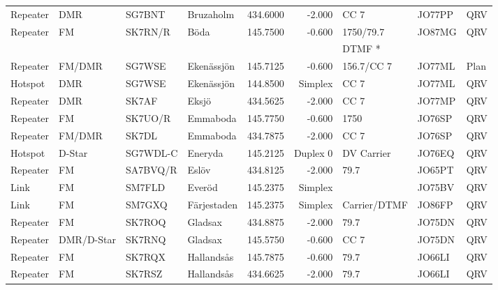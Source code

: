 \begin{longtable}{llllrrlll}
Repeater & DMR             & SG7BNT   & Bruzaholm    & 434.6000     & -2.000     & CC 7         & JO77PP      & QRV      \\
Repeater & FM              & SK7RN/R  & Böda         & 145.7500     & -0.600     & 1750/79.7    & JO87MG      & QRV      \\
         &                 &          &              &              &            & DTMF *       &             &          \\
Repeater & FM/DMR          & SG7WSE   & Ekenässjön   & 145.7125     & -0.600     & 156.7/CC 7   & JO77ML      & Plan     \\
Hotspot  & DMR             & SG7WSE   & Ekenässjön   & 144.8500     & Simplex    & CC 7         & JO77ML      & QRV      \\
Repeater & DMR             & SK7AF    & Eksjö        & 434.5625     & -2.000     & CC 7         & JO77MP      & QRV      \\
Repeater & FM              & SK7UO/R  & Emmaboda     & 145.7750     & -0.600     & 1750         & JO76SP      & QRV      \\
Repeater & FM/DMR          & SK7DL    & Emmaboda     & 434.7875     & -2.000     & CC 7         & JO76SP      & QRV      \\
Hotspot  & D-Star          & SG7WDL-C & Eneryda      & 145.2125     & Duplex 0   & DV Carrier   & JO76EQ      & QRV      \\
Repeater & FM              & SA7BVQ/R & Eslöv        & 434.8125     & -2.000     & 79.7         & JO65PT      & QRV      \\
Link     & FM              & SM7FLD   & Everöd       & 145.2375     & Simplex    &              & JO75BV      & QRV      \\
Link     & FM              & SM7GXQ   & Färjestaden  & 145.2375     & Simplex    & Carrier/DTMF & JO86FP      & QRV      \\
Repeater & FM              & SK7ROQ   & Gladsax      & 434.8875     & -2.000     & 79.7         & JO75DN      & QRV      \\
Repeater & DMR/D-Star      & SK7RNQ   & Gladsax      & 145.5750     & -0.600     & CC 7         & JO75DN      & QRV      \\
Repeater & FM              & SK7RQX   & Hallandsås   & 145.7875     & -0.600     & 79.7         & JO66LI      & QRV      \\
Repeater & FM              & SK7RSZ   & Hallandsås   & 434.6625     & -2.000     & 79.7         & JO66LI      & QRV      \\

\end{longtable}
